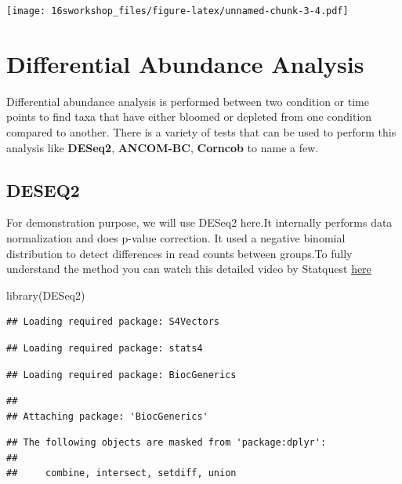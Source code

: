 \documentclass[
]{book}
\newenvironment{Shaded}{\begin{snugshade}}{\end{snugshade}}
\newcommand{\FunctionTok}[1]{\textcolor[rgb]{0.00,0.00,0.00}{#1}}
\newcommand{\NormalTok}[1]{#1}
\begin{document}
\texttt{[image: 16sworkshop\_files/figure-latex/unnamed-chunk-3-4.pdf]}

\hypertarget{differential-abundance-analysis}{%
\section{Differential Abundance Analysis}\label{differential-abundance-analysis}}

Differential abundance analysis is performed between two condition or time points to find taxa that have either bloomed or depleted from one condition compared to another.
There is a variety of tests that can be used to perform this analysis like \textbf{DESeq2}, \textbf{ANCOM-BC}, \textbf{Corncob} to name a few.

\hypertarget{deseq2}{%
\subsection{DESEQ2}\label{deseq2}}

For demonstration purpose, we will use DESeq2 here.It internally performs data normalization and does p-value correction. It used a negative binomial distribution to detect differences in read counts between groups.To fully understand the method you can watch this detailed video by Statquest \href{https://www.youtube.com/watch?v=UFB993xufUU\&t=12s\&ab_channel=StatQuestwithJoshStarmer}{here}

\begin{Shaded}
\begin{Highlighting}[]
\FunctionTok{library}\NormalTok{(DESeq2)}
\end{Highlighting}
\end{Shaded}

\begin{verbatim}
## Loading required package: S4Vectors
\end{verbatim}

\begin{verbatim}
## Loading required package: stats4
\end{verbatim}

\begin{verbatim}
## Loading required package: BiocGenerics
\end{verbatim}

\begin{verbatim}
## 
## Attaching package: 'BiocGenerics'
\end{verbatim}

\begin{verbatim}
## The following objects are masked from 'package:dplyr':
## 
##     combine, intersect, setdiff, union
\end{verbatim}
\end{document}
